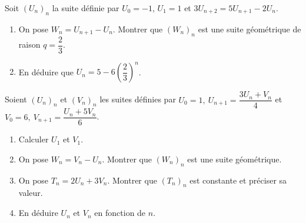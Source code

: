 Soit $(U_n)_n$ la suite définie par $U_0=-1$, $U_1=1$ et $3U_{n+2}=5U_{n+1}-2U_n$.
\begin{enumerate}
\item On pose $W_n=U_{n+1}-U_n$. Montrer que $(W_n)_n$ est une suite géométrique de raison $q=\dfrac23$.
\item En déduire que $U_n=5-6\left(\dfrac23\right)^n$.
\end{enumerate}
\fin
{}
Soient $(U_n)_n$ et $(V_n)_n$ les suites définies par
$U_0=1,\ U_{n+1}=\dfrac{3U_n+V_n}{4}$ \quad et \quad $V_0=6,\ V_{n+1}=\dfrac{U_n+5V_n}{6}$.
\begin{enumerate}
\item Calculer $U_1$ et $V_1$.
\item On pose $W_n=V_n-U_n$. Montrer que $(W_n)_n$ est une suite géométrique.
\item On pose $T_n=2U_n+3V_n$. Montrer que $(T_n)_n$ est constante et préciser sa valeur.
\item En déduire $U_n$ et $V_n$ en fonction de $n$.
\end{enumerate}
\fin
